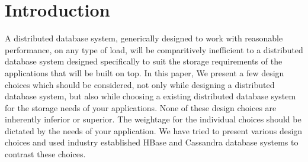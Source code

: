 \section{Introduction}

A distributed database system, generically designed to work with reasonable performance, on any type of load, will be comparitively inefficient to a distributed database system designed specifically to suit the storage requirements of the applications that will be built on top. In this paper, We present a few design choices which should be considered, not only while designing a distributed database system, but also while choosing a existing distributed database system for the storage needs of your applications. None of these design choices are inherently inferior or superior. The weightage for the individual choices should be dictated by the needs of your application. We have tried to present various design choices and used industry established HBase and Cassandra database systems to contrast these choices.